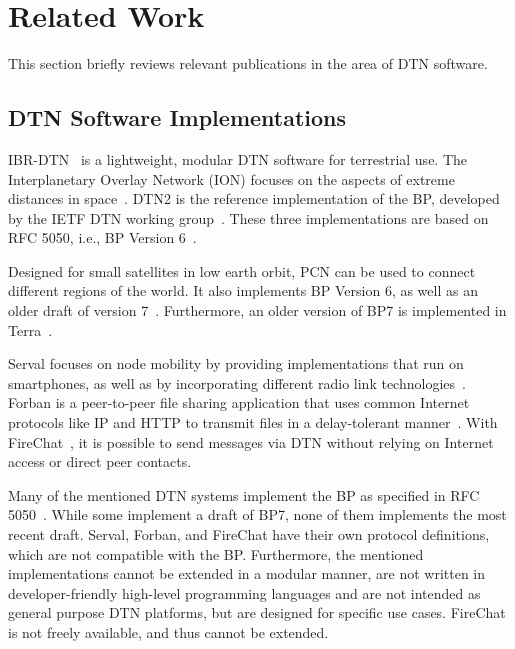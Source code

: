 \section{Related Work}
\label{sec:relwork}

This section briefly reviews relevant publications in the area of DTN software.

\subsection{DTN Software Implementations}

IBR-DTN~\cite{doering2008ibr} is a lightweight, modular DTN software for terrestrial use.  
The Interplanetary Overlay Network (ION)
focuses on the aspects of extreme distances in space~\cite{burleigh2007interplanetary}.
DTN2 is the reference implementation of the BP, developed by the IETF DTN working group~\cite{demmer2004implementing}.
These three implementations are based on RFC 5050, i.e., BP Version 6~\cite{rfc5050}.

Designed for small satellites in low earth orbit, {\textmu}PCN can be used to connect different regions of the world.
It also implements BP Version 6, as well as an older draft of version 7~\cite{feldmann2015upcn}.
Furthermore, an older version of BP7 is implemented in Terra~\cite{rightmesh2019Terra}.

Serval focuses on node mobility by providing implementations that run on smartphones, as well as by incorporating different radio link technologies~\cite{gardner2011serval}.
Forban is a peer-to-peer file sharing application that uses common Internet protocols like IP and HTTP to transmit files in a delay-tolerant manner~\cite{dulauny2019forban}.
With FireChat~\cite{garden2015firechat}, it is possible to send messages via DTN without relying on Internet access or direct peer contacts.

Many of the mentioned DTN systems implement the BP as specified in RFC 5050~\cite{rfc5050}.
While some implement a draft of BP7, none of them implements the most recent draft.
Serval, Forban, and FireChat have their own protocol definitions, which are not compatible with the BP.
Furthermore, the mentioned implementations cannot be extended in a modular manner, are not written in developer-friendly high-level programming languages and are not intended as general purpose DTN platforms, but are designed for specific use cases.
FireChat is not freely available, and thus cannot be extended.

